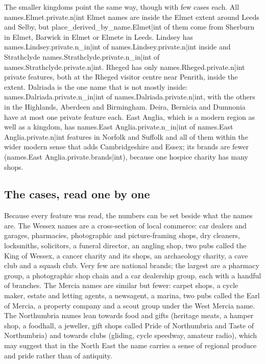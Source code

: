 \documentclass[11pt,a4paper]{article}
\begin{document}
The smaller kingdoms point the same way, though with few cases each. All {{names.Elmet.private.n|int}} Elmet names are inside the Elmet extent around Leeds and Selby, but {{place_derived_by_name.Elmet|int}} of them come from Sherburn in Elmet, Barwick in Elmet or Elmete in Leeds. Lindsey has {{names.Lindsey.private.n_in|int}} of {{names.Lindsey.private.n|int}} inside and Strathclyde {{names.Strathclyde.private.n_in|int}} of {{names.Strathclyde.private.n|int}}. Rheged has only {{names.Rheged.private.n|int}} private features, both at the Rheged visitor centre near Penrith, inside the extent. Dalriada is the one name that is not mostly inside: {{names.Dalriada.private.n_in|int}} of {{names.Dalriada.private.n|int}}, with the others in the Highlands, Aberdeen and Birmingham. Deira, Bernicia and Dumnonia have at most one private feature each. East Anglia, which is a modern region as well as a kingdom, has {{names.East Anglia.private.n_in|int}} of {{names.East Anglia.private.n|int}} features in Norfolk and Suffolk and all of them within the wider modern sense that adds Cambridgeshire and Essex; its brands are fewer ({{names.East Anglia.private.brands|int}}), because one hospice charity has many shops.


\subsection{The cases, read one by one}
Because every feature was read, the numbers can be set beside what the names are. The Wessex names are a cross-section of local commerce: car dealers and garages, pharmacies, photographic and picture-framing shops, dry cleaners, locksmiths, solicitors, a funeral director, an angling shop, two pubs called the King of Wessex, a cancer charity and its shops, an archaeology charity, a cave club and a squash club. Very few are national brands; the largest are a pharmacy group, a photographic shop chain and a car dealership group, each with a handful of branches. The Mercia names are similar but fewer: carpet shops, a cycle maker, estate and letting agents, a newsagent, a marina, two pubs called the Earl of Mercia, a property company and a scout group under the West Mercia name. The Northumbria names lean towards food and gifts (heritage meats, a hamper shop, a foodhall, a jeweller, gift shops called Pride of Northumbria and Taste of Northumbria) and towards clubs (gliding, cycle speedway, amateur radio), which may suggest that in the North East the name carries a sense of regional produce and pride rather than of antiquity.
\end{document}
